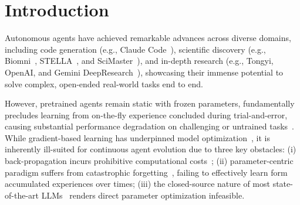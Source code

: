 \section{Introduction}
Autonomous agents have achieved remarkable advances across diverse domains, including code generation (e.g., Claude Code~\cite{anthropic2025claude}), scientific discovery (e.g., Biomni~\cite{huang2025biomni}, STELLA~\cite{jin2025stellaselfevolvingllmagent}, and SciMaster~\cite{chai2025scimastergeneralpurposescientificai}), and in-depth research (e.g., Tongyi, OpenAI, and Gemini DeepResearch~\cite{tongyidr,openai2025deepresearch,google2025gemini}), showcasing their immense potential to solve complex, open-ended real-world tasks end to end. 

However, pretrained agents remain static with frozen parameters, fundamentally precludes learning from on-the-fly experience concluded during trial-and-error, causing substantial performance degradation on challenging or untrained tasks~\cite{wu2023autogen,liu2023agentbench}.
While gradient-based learning has underpinned model optimization~\cite{rumelhart1986learning,ruder2016overview,hu2022lora}, it is inherently ill-suited for continuous agent evolution due to three key obstacles:
(i) back-propagation incurs prohibitive computational costs~\cite{goodfellow2013empirical,cai2025training};
(ii) parameter-centric paradigm suffers from catastrophic forgetting~\cite{abbas2023loss,hadi2023large}, failing to effectively learn form accumulated experiences over times;
(iii) the closed-source nature of most state-of-the-art LLMs~\cite{google2025gemini2_5_pro,openai2025gpt5,anthropic2025sonnet4.5,anthropic2025claude4,xai2025grok4} renders direct parameter optimization infeasible.

